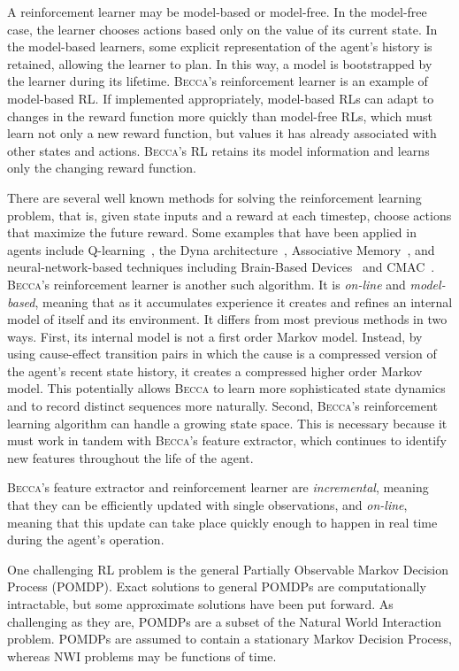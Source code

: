 A reinforcement learner may be model-based or model-free. In the model-free case, the learner chooses actions based only on the value of its current state. In the model-based learners, some explicit representation of the agent's history is retained, allowing the learner to plan. In this way, a model is bootstrapped by the learner during its lifetime. \textsc{Becca}'s reinforcement learner is an example of model-based RL. If implemented appropriately, model-based RLs can adapt to changes in the reward function more quickly than model-free RLs, which must learn not only a new reward function, but values it has already associated with other states and actions. \textsc{Becca}'s RL retains its model information and learns only the changing reward function.

There are several well known methods for solving the reinforcement learning problem, that is, given state inputs and a reward at each timestep, choose actions that maximize the future reward. Some examples that have been applied in agents include Q-learning~\cite{watkins92}, the Dyna architecture~\cite{sutton91}, Associative Memory~\cite{levinson05}, and neural-network-based techniques including Brain-Based Devices~\cite{mckinstry06} and CMAC~\cite{albus75}. \textsc{Becca}'s reinforcement learner is another such algorithm. It is {\em on-line} and {\em model-based}, meaning that as it accumulates experience it creates and refines an internal model of itself and its environment. It differs from most previous methods in two ways. First, its internal model is not a first order Markov model. Instead, by using cause-effect transition pairs in which the cause is a compressed version of the agent's recent state history, it creates a compressed higher order Markov model. This potentially allows \textsc{Becca} to learn more sophisticated state dynamics and to record distinct sequences more naturally. Second, \textsc{Becca}'s reinforcement learning algorithm can handle a growing state space. This is necessary because it must work in tandem with \textsc{Becca}'s feature extractor, which continues to identify new features throughout the life of the agent.

\textsc{Becca}'s feature extractor and reinforcement learner are {\em incremental}, meaning that they can be efficiently updated with single observations, and {\em on-line}, meaning that this update can take place quickly enough to happen in real time during the agent's operation.

One challenging RL problem is the general Partially Observable Markov Decision Process (POMDP). Exact solutions to general POMDPs are computationally intractable, but some approximate solutions have been put forward. As challenging as they are, POMDPs are a subset of the Natural World Interaction problem. POMDPs are assumed to contain a stationary Markov Decision Process, whereas NWI problems may be functions of time.

